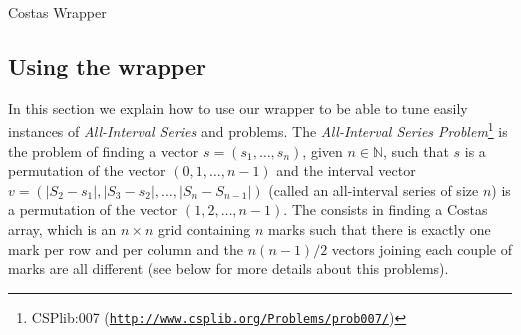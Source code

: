 \linesnumbered
\begin{algorithm}[H]
	\caption{Costas Wrapper}
	\label{wrapper}
	\dontprintsemicolon
	\SetLine
	
	\BlankLine
	
	\fork{} 
\end{algorithm}

\subsection{Using the wrapper}

In this section we explain how to use our wrapper to be able to tune easily instances of {\it All-Interval Series} and \carr{} problems. The {\it All-Interval Series Problem}\footnote{CSPlib:007 (\href{http://www.csplib.org/Problems/prob007/}{\texttt{http://www.csplib.org/Problems/prob007/}})} is the problem of finding a vector $s=\left(s_1,\dots,s_n\right)$, given $n \in \mathbb{N}$, such that $s$ is a permutation of the vector $(0, 1, \dots, n-1)$ and the interval vector $v = \left(\left|S_2-s_1\right|, \left|S_3-s_2\right|, \dots, \left|S_n-S_{n-1}\right|\right)$ (called an all-interval series of size $n$) is a permutation of the vector $(1, 2, \dots, n-1)$. The \carrp{} consists in finding a Costas array, which is an $n\times n$ grid containing $n$ marks such that there is exactly one mark per row and per column and the $n(n-1)/2$ vectors joining each couple of marks are all different (see below for more details about this problems).

